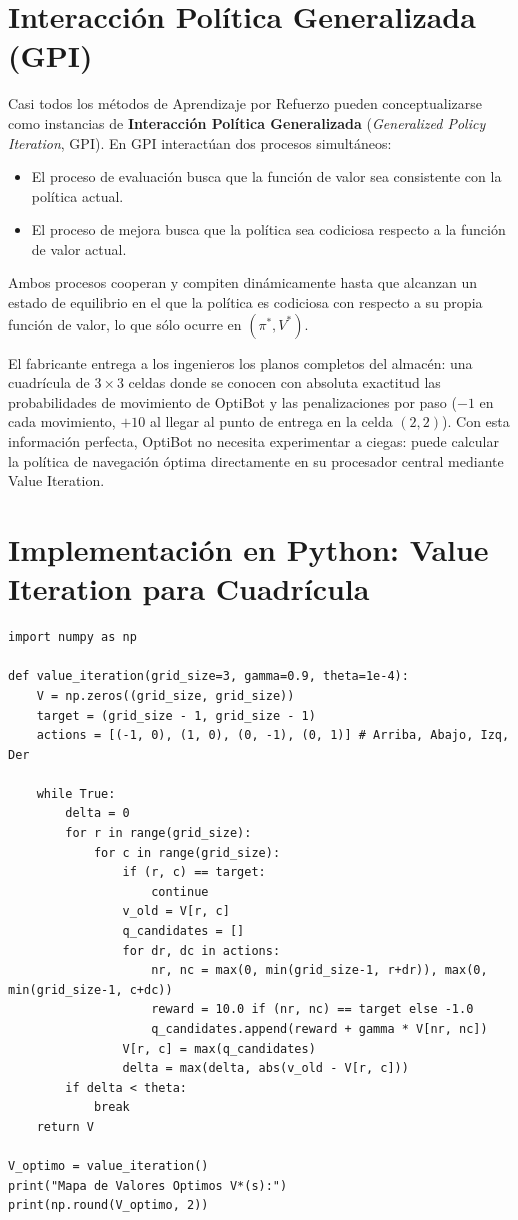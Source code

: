 \section{Interacción Política Generalizada (GPI)}
Casi todos los métodos de Aprendizaje por Refuerzo pueden conceptualizarse como instancias de \textbf{Interacción Política Generalizada} (\textit{Generalized Policy Iteration}, GPI). En GPI interactúan dos procesos simultáneos:
\begin{itemize}
  \item El proceso de evaluación busca que la función de valor sea consistente con la política actual.
  \item El proceso de mejora busca que la política sea codiciosa respecto a la función de valor actual.
\end{itemize}
Ambos procesos cooperan y compiten dinámicamente hasta que alcanzan un estado de equilibrio en el que la política es codiciosa con respecto a su propia función de valor, lo que sólo ocurre en $(\pi^*, V^*)$.

\begin{optibot}
El fabricante entrega a los ingenieros los planos completos del almacén: una cuadrícula de $3 \times 3$ celdas donde se conocen con absoluta exactitud las probabilidades de movimiento de OptiBot y las penalizaciones por paso ($-1$ en cada movimiento, $+10$ al llegar al punto de entrega en la celda $(2,2)$). Con esta información perfecta, OptiBot no necesita experimentar a ciegas: puede calcular la política de navegación óptima directamente en su procesador central mediante Value Iteration.
\end{optibot}

\section{Implementación en Python: Value Iteration para Cuadrícula}
\begin{lstlisting}[style=rlcode]
import numpy as np

def value_iteration(grid_size=3, gamma=0.9, theta=1e-4):
    V = np.zeros((grid_size, grid_size))
    target = (grid_size - 1, grid_size - 1)
    actions = [(-1, 0), (1, 0), (0, -1), (0, 1)] # Arriba, Abajo, Izq, Der

    while True:
        delta = 0
        for r in range(grid_size):
            for c in range(grid_size):
                if (r, c) == target:
                    continue
                v_old = V[r, c]
                q_candidates = []
                for dr, dc in actions:
                    nr, nc = max(0, min(grid_size-1, r+dr)), max(0, min(grid_size-1, c+dc))
                    reward = 10.0 if (nr, nc) == target else -1.0
                    q_candidates.append(reward + gamma * V[nr, nc])
                V[r, c] = max(q_candidates)
                delta = max(delta, abs(v_old - V[r, c]))
        if delta < theta:
            break
    return V

V_optimo = value_iteration()
print("Mapa de Valores Optimos V*(s):")
print(np.round(V_optimo, 2))
\end{lstlisting}

